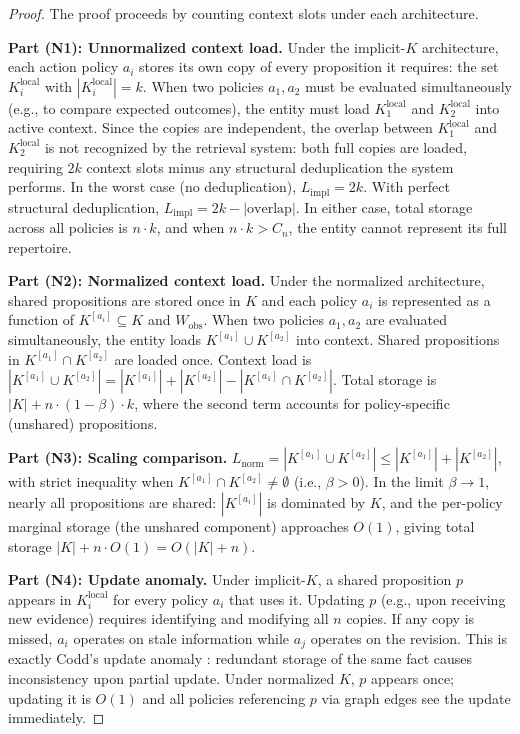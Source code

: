 \documentclass[11pt]{article}
\theoremstyle{definition}
\theoremstyle{remark}
\begin{document}
\begin{proof}
The proof proceeds by counting context slots under each architecture.

\textbf{Part (N1): Unnormalized context load.}
Under the implicit-$K$ architecture, each action policy $a_i$ stores
its own copy of every proposition it requires: the set
$K_i^{\text{local}}$ with $|K_i^{\text{local}}| = k$. When two
policies $a_1, a_2$ must be evaluated simultaneously (e.g., to compare
expected outcomes), the entity must load $K_1^{\text{local}}$ and
$K_2^{\text{local}}$ into active context. Since the copies are
independent, the overlap between $K_1^{\text{local}}$ and
$K_2^{\text{local}}$ is not recognized by the retrieval system: both
full copies are loaded, requiring $2k$ context slots minus any
structural deduplication the system performs. In the worst case
(no deduplication), $L_{\text{impl}} = 2k$. With perfect structural
deduplication, $L_{\text{impl}} = 2k - |\text{overlap}|$. In either
case, total storage across all policies is $n \cdot k$, and when
$n \cdot k > C_n$, the entity cannot represent its full repertoire.

\textbf{Part (N2): Normalized context load.}
Under the normalized architecture, shared propositions are stored once
in $K$ and each policy $a_i$ is represented as a function of $K^{[a_i]}
\subseteq K$ and $W_{\text{obs}}$. When two policies $a_1, a_2$ are
evaluated simultaneously, the entity loads $K^{[a_1]} \cup K^{[a_2]}$
into context. Shared propositions in $K^{[a_1]} \cap K^{[a_2]}$ are
loaded once. Context load is $|K^{[a_1]} \cup K^{[a_2]}| = |K^{[a_1]}|
+ |K^{[a_2]}| - |K^{[a_1]} \cap K^{[a_2]}|$. Total storage is
$|K| + n \cdot (1 - \beta) \cdot k$, where the second term accounts
for policy-specific (unshared) propositions.

\textbf{Part (N3): Scaling comparison.}
$L_{\text{norm}} = |K^{[a_1]} \cup K^{[a_2]}| \leq |K^{[a_1]}| +
|K^{[a_2]}|$, with strict inequality when
$K^{[a_1]} \cap K^{[a_2]} \neq \emptyset$ (i.e., $\beta > 0$).
In the limit $\beta \to 1$, nearly all propositions are shared:
$|K^{[a_i]}|$ is dominated by $K$, and the per-policy marginal
storage (the unshared component) approaches $O(1)$, giving total
storage $|K| + n \cdot O(1) = O(|K| + n)$.

\textbf{Part (N4): Update anomaly.}
Under implicit-$K$, a shared proposition $p$ appears in
$K_i^{\text{local}}$ for every policy $a_i$ that uses it. Updating $p$
(e.g., upon receiving new evidence) requires identifying and modifying
all $n$ copies. If any copy is missed, $a_i$ operates on stale
information while $a_j$ operates on the revision. This is exactly
Codd's update anomaly \cite{Codd1970}: redundant storage of the same
fact causes inconsistency upon partial update. Under normalized $K$,
$p$ appears once; updating it is $O(1)$ and all policies referencing
$p$ via graph edges see the update immediately.


\end{proof}
\end{document}
